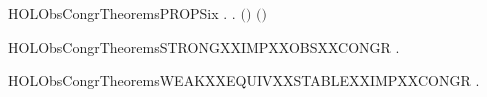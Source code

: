 \newcommand{\HOLObsCongrTheoremsOBSXXCONGRXXWEAKXXTRANSYY}{\UseVerbatim{HOLObsCongrTheoremsOBSXXCONGRXXWEAKXXTRANSYY}}
\begin{SaveVerbatim}{HOLObsCongrTheoremsPROPSix}
\HOLTokenTurnstile{} \HOLSymConst{\HOLTokenForall{}} .    \HOLSymConst{\HOLTokenImp{}} \HOLSymConst{\HOLTokenForall{}}.  \ensuremath{(}\HOLSymConst{\ensuremath{\ldotp}}\ensuremath{)} \ensuremath{(}\HOLSymConst{\ensuremath{\ldotp}}\ensuremath{)}
\end{SaveVerbatim}
\newcommand{\HOLObsCongrTheoremsPROPSix}{\UseVerbatim{HOLObsCongrTheoremsPROPSix}}
\begin{SaveVerbatim}{HOLObsCongrTheoremsSTRONGXXIMPXXOBSXXCONGR}
\HOLTokenTurnstile{} \HOLSymConst{\HOLTokenForall{}} .    \HOLSymConst{\HOLTokenImp{}}   
\end{SaveVerbatim}
\newcommand{\HOLObsCongrTheoremsSTRONGXXIMPXXOBSXXCONGR}{\UseVerbatim{HOLObsCongrTheoremsSTRONGXXIMPXXOBSXXCONGR}}
\begin{SaveVerbatim}{HOLObsCongrTheoremsWEAKXXEQUIVXXSTABLEXXIMPXXCONGR}
\HOLTokenTurnstile{} \HOLSymConst{\HOLTokenForall{}} .
          \HOLSymConst{\HOLTokenConj{}}   \HOLSymConst{\HOLTokenConj{}}   \HOLSymConst{\HOLTokenImp{}}   
\end{SaveVerbatim}
\newcommand{\HOLObsCongrTheoremsWEAKXXEQUIVXXSTABLEXXIMPXXCONGR}{\UseVerbatim{HOLObsCongrTheoremsWEAKXXEQUIVXXSTABLEXXIMPXXCONGR}}
